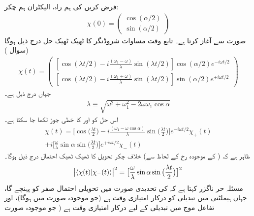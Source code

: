 فرض کریں  کی  ہم راہ،    الیکٹران ہم چکر:
\begin{align}
\chi (0) = 
\begin{pmatrix} 
\cos(\alpha/2) \\[0.5em]
\sin(\alpha/2)
\end{pmatrix}
\end{align}
  صورت سے آغاز کرتا ہے۔  تابع وقت مساوات شروڈنگر کا  ٹھیک ٹھیک  حل درج ذیل ہوگا  (سوال  )
\begin{align}\label{مساوات_حر_حل_مخصوص_ہیملٹنی}
\chi (t) = 
\begin{pmatrix}
[\cos(\lambda t/2) - i \frac{(\omega_1 - \omega)}{\lambda} \sin(\lambda t/2)] \cos(\alpha/2) e^{- i \omega t/2} \\[0.5em]
[\cos(\lambda t/2) - i \frac{(\omega_1 + \omega)}{\lambda} \sin(\lambda t/2)] \sin(\alpha/2) e^{+ i \omega t/2}
\end{pmatrix}
\end{align}
جہاں  درج ذیل  ہے۔
\begin{align}
\lambda \equiv \sqrt{\omega^2 + \omega_1^2 - 2 \omega \omega_1 \cos \alpha}
\end{align}
اس حل  کو   اور  کا خطی  جوڑ  لکھا جا سکتا ہے۔
\begin{multline}\label{مساوات_حر_حل_خطی_جوڑ}
\chi (t) = \big [ \cos\big ( \frac{\lambda t}{2} \big ) - i \frac{(\omega_1 - \omega \cos \alpha)}{\lambda} \sin\big ( \frac{\lambda t}{2} \big ) \big ] e^{- i \omega t/2} \chi_{+} (t) \\
+ i \big [ \frac{\omega}{\lambda} \sin \alpha \sin \big ( \frac{\lambda t}{2} \big ) \big ] e^{+ i \omega t/2} \chi_- (t)
\end{multline}
ظاہر ہے کہ  ( کے موجودہ رخ کے لحاظ سے)  خلاف چکر  تحویل کا ٹھیک ٹھیک احتمال درج ذیل ہوگا۔ 
\begin{align}\label{مساوات_حر_تحویلی_احتمال}
\abs{\langle \chi (t) | \chi_{-} (t) \rangle}^2 = \big [ \frac{\omega}{\lambda} \sin \alpha \sin \big ( \frac{\lambda t}{2} \big ) \big ]^2
\end{align}
مسئلہ حر ناگزر کہتا ہے کہ  کی تحدیدی صورت میں تحویلی احتمال صفر کو پہنچے گا،  جہاں ہیملٹنی میں تبدیلی کو درکار امتیازی وقت  ہے  (جو موجودہ صورت میں  ہوگا)،  اور تفاعل موج میں تبدیلی کے لیے درکار امتیازی وقت  ہے ( جو موجودہ صورت 
